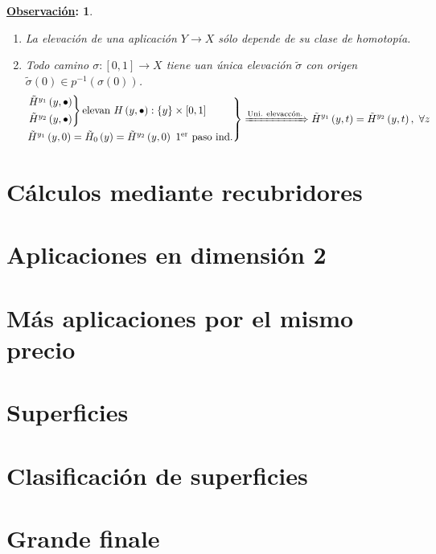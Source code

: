 \documentclass[10pt,a4paper,openright]{book}
\theoremstyle{break}
\newtheorem*{obs}{\underline{Observación}:}
\begin{document}
\begin{obs}
\begin{enumerate}
    \item La elevación de una aplicación $Y \rightarrow X$ sólo depende de su clase de homotopía.
    \item Todo camino $\sigma: \left[ 0, 1 \right] \rightarrow X$ tiene uan única elevación $\tilde{\sigma}$ con origen $\tilde{\sigma}\left( 0 \right) \in p^{-1}\left( \sigma\left( 0 \right) \right)$.
    \[
    \begin{rcases}
    \begin{rcases}
        \tilde{H}^{y_1} \left( y, \bullet \right)\\
        \tilde{H}^{y_2} \left( y, \bullet \right) 
    \end{rcases} \text{elevan } H\left( y, \bullet \right) : \{y\} \times \left[ 0, 1 \right] \\  
    \tilde{H}^{y_1} \left( y, 0 \right) = \tilde{H}_0\left( y \right) = \tilde{H}^{y_2} \left( y, 0 \right) \text{ 1\textsuperscript{er} paso ind.} 
    \end{rcases} \xRightarrow{\text{Uni. elevaccón.}} 
    \tilde{H}^{y_1} \left( y, t \right) = \tilde{H}^{y_2} \left( y, t \right),\ \forall z
    \]
\end{enumerate}
\end{obs}


\chapter{Cálculos mediante recubridores}%
\label{cha:calculos_mediante_recubridores}

\chapter{Aplicaciones en dimensión 2}%
\label{cha:aplicaciones_en_dimension_2_}

\chapter{Más aplicaciones por el mismo precio}%
\label{cha:mas_aplicaciones_por_el_mismo_precio}

\chapter{Superficies}%
\label{cha:superficies}

\chapter{Clasificación de superficies}%
\label{cha:clasificacion_de_superficies}

\chapter{Grande finale}%
\label{cha:grande_finale}
\end{document}
